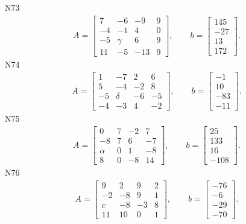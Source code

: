 \documentclass[11pt]{report}
\begin{document}
N73
\begin{align*}
 A = \left[\begin{matrix}7 & -6 & -9 & 9\\-4 & -1 & 4 & 0\\-5 & \gamma & 6 & 9\\11 & -5 & -13 & 9\end{matrix}\right],
\qquad b = \left[\begin{matrix}145\\-27\\13\\172\end{matrix}\right]. 
 \end{align*}
N74
\begin{align*}
 A = \left[\begin{matrix}1 & -7 & 2 & 6\\5 & -4 & -2 & 8\\-5 & \delta & -6 & -5\\-4 & -3 & 4 & -2\end{matrix}\right],
\qquad b = \left[\begin{matrix}-1\\10\\-83\\-11\end{matrix}\right]. 
 \end{align*}
N75
\begin{align*}
 A = \left[\begin{matrix}0 & 7 & -2 & 7\\-8 & 7 & 6 & -7\\\alpha & 0 & 1 & -8\\8 & 0 & -8 & 14\end{matrix}\right],
\qquad b = \left[\begin{matrix}25\\133\\16\\-108\end{matrix}\right]. 
 \end{align*}
N76
\begin{align*}
 A = \left[\begin{matrix}9 & 2 & 9 & 2\\-2 & -8 & 9 & 1\\c & -8 & -3 & 8\\11 & 10 & 0 & 1\end{matrix}\right],
\qquad b = \left[\begin{matrix}-76\\-6\\-29\\-70\end{matrix}\right]. 
 \end{align*}
\end{document}
